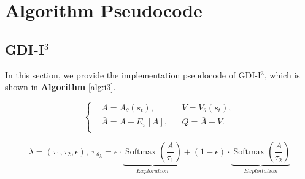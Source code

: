 \clearpage





\section{Algorithm Pseudocode}
\label{App: Algorithm Pseudocode}

\subsection{GDI-I$^3$}
In this section, we provide the implementation pseudocode of GDI-I$^3$, which is shown in \textbf{Algorithm} \ref{alg:i3}.

\begin{equation}
\label{Equ: i3 casa equ}
    \left\{
    \begin{aligned}
        &A=A_{\theta}\left(s_{t}\right),& 
        &V=V_{\theta}\left(s_{t}\right), \\
        &\bar{A}=A-E_{\pi}[A],& 
        &Q=\bar{A}+V. \\
    \end{aligned}
    \right.
\end{equation}

\begin{equation}
\label{Equ: i3 soft entropy}
    \lambda = (\tau_1, \tau_2, \epsilon), \ 
    \pi_{\theta_{\lambda}}=\epsilon \cdot \underbrace{\operatorname{Softmax}\left(\frac{A}{\tau_{1}}\right)}_{Exploration}+(1-\epsilon) \cdot \underbrace{\operatorname{Softmax}\left(\frac{A}{\tau_{2}}\right)}_{Exploitation}
\end{equation}


